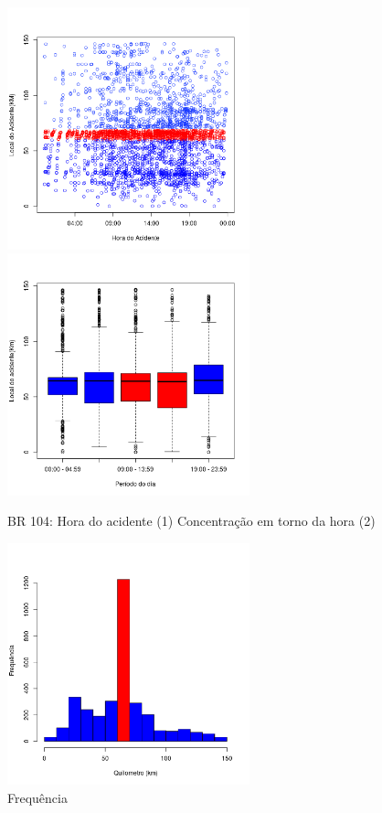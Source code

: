 \begin{figure}[h]
	\caption{BR 104: Hora do acidente (1) Concentração em torno da hora (2)}
	\includegraphics[width=7cm,height=7cm]{Figuras/Preprocess/br104_12.png}
	\includegraphics[width=7cm,height=7cm]{Figuras/Preprocess/br104_2.png}

\end{figure}

\quad \quad
\begin{figure}[h]
	\centering
	\caption{ Frequência}
	\includegraphics[width=7cm,height=7cm]{Figuras/Preprocess/br104_3.png}
\end{figure}

